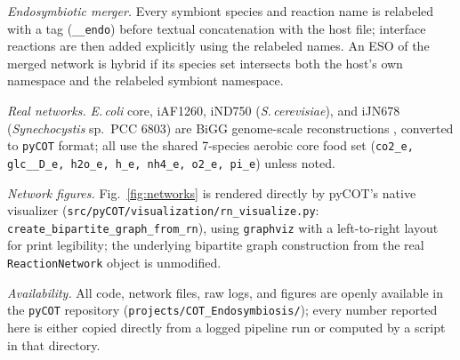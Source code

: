 \documentclass[9pt,twocolumn,twoside]{pnas-new}
\begin{document}
{\textit{Endosymbiotic merger.} Every symbiont species and reaction name is relabeled with a tag (\texttt{\_\_endo}) before textual concatenation with the host file; interface reactions are then added explicitly using the relabeled names. An ESO of the merged network is hybrid if its species set intersects both the host's own namespace and the relabeled symbiont namespace.

\textit{Real networks.} \textit{E.\,coli} core, iAF1260, iND750 (\textit{S.\,cerevisiae}), and iJN678 (\textit{Synechocystis} sp.\ PCC 6803) are BiGG genome-scale reconstructions \cite{king2016bigg,orth2010core}, converted to \texttt{pyCOT} format; all use the shared 7-species aerobic core food set (\texttt{co2\_e, glc\_\_D\_e, h2o\_e, h\_e, nh4\_e, o2\_e, pi\_e}) unless noted.

\textit{Network figures.} Fig.~\ref{fig:networks} is rendered directly by pyCOT's native visualizer (\texttt{src/pyCOT/visualization/rn\_visualize.py}: \texttt{create\_bipartite\_graph\_from\_rn}), using \texttt{graphviz} with a left-to-right layout for print legibility; the underlying bipartite graph construction from the real \texttt{ReactionNetwork} object is unmodified.

\textit{Availability.} All code, network files, raw logs, and figures are openly available in the \texttt{pyCOT} repository (\texttt{projects/COT\_Endosymbiosis/}); every number reported here is either copied directly from a logged pipeline run or computed by a script in that directory.
}

\showmatmethods{}


\showacknow{}


\end{document}
